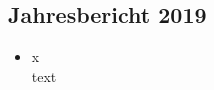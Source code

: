 \subsection{Jahresbericht 2019}
\begin{history}


    \begin{itemize}

        \item[]x\\
        text

    \end{itemize}

\end{history}
